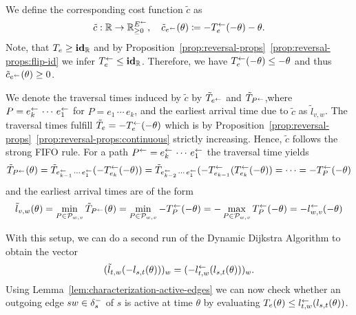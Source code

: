 We define the corresponding cost function $\tilde c$ as \[
    \tilde c : \mathbb{R} \rightarrow \mathbb{R}_{\geq0}^{E^{\leftarrow}}, \quad
    \tilde c_{e^{\leftarrow}}(\theta) \coloneqq - T_e^{\leftarrow}(-\theta) - \theta.
\]
Note, that $T_e  \geq \mathbf{id}_{\mathbb{R}}$ and by Proposition~\ref{prop:reversal-props}~\ref{prop:reversal-props:flip-id} we infer $T_e^{\leftarrow} \leq \mathbf{id}_{\mathbb{R}}$.
Therefore, we have $T_e^{\leftarrow}(-\theta) \leq -\theta$ and thus $\tilde c_{e^{\leftarrow}}(\theta) \geq 0$.

We denote the traversal times induced by $\tilde c$ by $\tilde T_{e^{\leftarrow}}$ and $\tilde T_{P^{\leftarrow}}$,where $P = e_k^{\leftarrow} \, \cdots \, e_1^{\leftarrow}$ for $P = e_1\,\cdots\, e_k$,
and the earliest arrival time due to $\tilde c$ as $\tilde l_{v,w}$.
The traversal times fulfill $\tilde T_e = -T_e^{\leftarrow}(-\theta)$ which is by Proposition~\ref{prop:reversal-props}~\ref{prop:reversal-props:continuous} strictly increasing.
Hence, $\tilde c$ follows the strong FIFO rule.
For a path $P^{\leftarrow} = e_k^{\leftarrow}\,\cdots\, e_1^{\leftarrow}$ the traversal time yields
\[
    \tilde T_{P^{\leftarrow}} (\theta)
    = \tilde T_{e_{k-1}^{\leftarrow}\,\cdots\,e_1^{\leftarrow}}(- T_{e_k}^{\leftarrow} ( - \theta ))
    = \tilde T_{e_{k-2}^{\leftarrow}\,\cdots\,e_1^{\leftarrow}}(-T_{e_{k-1}}^{\leftarrow} (T_{e_k}^{\leftarrow} ( - \theta ))
    = \cdots
    = - T_P^{\leftarrow}(-\theta)
\]
and the earliest arrival times are of the form
\[
    \tilde l_{v,w}(\theta)
    = \min_{P\in\mathcal{P}_{w,v}} \tilde T_{P^{\leftarrow}}(\theta)
    = \min_{P\in\mathcal{P}_{w,v}} - T_P^{\leftarrow}(-\theta)
    = - \max_{P\in\mathcal{P}_{w,v}} T_P^{\leftarrow}(-\theta)
    = - l_{w,v}^{\leftarrow}(-\theta)
\]

With this setup, we can do a second run of the Dynamic Dijkstra Algorithm to obtain the vector \[
    (\tilde l_{t,w}( - l_{s,t}(\theta) ))_w = (- l_{t,w}^{\leftarrow}( l_{s,t}(\theta) ))_w.
\]
Using Lemma~\ref{lem:characterization-active-edges} we can now check whether an outgoing edge $sw\in\delta^-_{s}$ of $s$ is active at time $\theta$ by evaluating $T_e(\theta) \leq l_{t,w}^{\leftarrow}( l_{s,t}(\theta))$.

